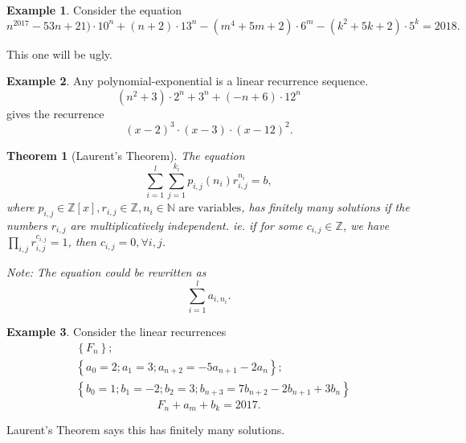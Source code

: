 \documentclass[11pt]{article}
\newtheorem{thm}{Theorem}[section]
\theoremstyle{definition}
\newtheorem{example}{Example}[section]
\newcommand{\set}[1]{\left\{ #1 \right\}}
\newcommand{\ZZ}{\mathbb{Z}}
\newcommand{\NN}{\mathbb{N}}
\begin{document}
\begin{example}
	Consider the equation
	$$ n^2017 - 53n + 21) \cdot 10^n + (n+2) \cdot 13^n - (m^4 + 5m + 2) \cdot 6^m - (k^2 + 5k + 2) \cdot 5^k = 2018 . $$
\end{example}
\proof
	This one will be ugly.
\qedhere

\begin{example}
	Any polynomial-exponential is a linear recurrence sequence. 
	$$ (n^2 + 3) \cdot 2^n + 3^n + (-n + 6) \cdot 12^n $$
	gives the recurrence
	$$ (x-2)^3 \cdot (x-3) \cdot (x-12)^2 . $$
\end{example}

\begin{thm}[Laurent's Theorem]
	The equation 
	$$ \sum_{i=1}^{l} \sum_{j=1}^{k_i} p_{i,j} (n_i) r_{i,j}^{n_i} = b , $$
	where $p_{i,j} \in \ZZ[x] , r_{i,j} \in \ZZ, n_i\in\NN \text{ are variables}$,
	has finitely many solutions if the numbers $r_{i,j}$ are multiplicatively independent.
	ie. if for some $c_{i,j}\in\ZZ$, we have $\prod_{i,j} r_{i,j}^{c_{i,j}} = 1$, then $c_{i,j}=0, \forall i,j$. 
	
	Note: The equation could be rewritten as 
	$$ \sum_{i=1}^{l} a_{i,n_i} . $$
\end{thm}

\begin{example}
	Consider the linear recurrences 
	\begin{align*}
		&\set{F_n}; \\
		&\set{a_0=2; a_1=3; a_{n+2} = -5a_{n+1} - 2a_{n}}; \\
		&\set{b_0=1; b_1=-2; b_2=3; b_{n+3} = 7b_{n+2} - 2b_{n+1} + 3b_{n}}
	\end{align*}
	$$ F_n + a_m + b_k = 2017 . $$
\end{example}
\proof
	Laurent's Theorem says this has finitely many solutions.
\qedhere
\end{document}
